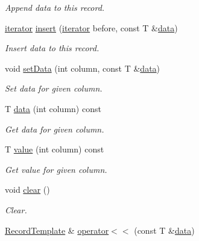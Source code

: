\begin{DoxyCompactItemize}
\begin{DoxyCompactList}\small\item\em Append data to this record. \end{DoxyCompactList}\item 
\hyperlink{class_mdt_1_1_plain_text_1_1_record_template_a0785bfc19bfa479d1097dbfcfdd03bef}{iterator} \hyperlink{class_mdt_1_1_plain_text_1_1_record_template_a473f1d26d8e87ccb714f802779e0b1e2}{insert} (\hyperlink{class_mdt_1_1_plain_text_1_1_record_template_a0785bfc19bfa479d1097dbfcfdd03bef}{iterator} before, const T \&\hyperlink{class_mdt_1_1_plain_text_1_1_record_template_aa6687a1e8e82a96fe3ae4d9fd79e8362}{data})
\begin{DoxyCompactList}\small\item\em Insert data to this record. \end{DoxyCompactList}\item 
void \hyperlink{class_mdt_1_1_plain_text_1_1_record_template_ade0db0c77de8a059b2eb1886e2357b39}{set\+Data} (int column, const T \&\hyperlink{class_mdt_1_1_plain_text_1_1_record_template_aa6687a1e8e82a96fe3ae4d9fd79e8362}{data})
\begin{DoxyCompactList}\small\item\em Set data for given column. \end{DoxyCompactList}\item 
T \hyperlink{class_mdt_1_1_plain_text_1_1_record_template_aa6687a1e8e82a96fe3ae4d9fd79e8362}{data} (int column) const 
\begin{DoxyCompactList}\small\item\em Get data for given column. \end{DoxyCompactList}\item 
T \hyperlink{class_mdt_1_1_plain_text_1_1_record_template_a40b9e693eaa8543769405400edf49ba3}{value} (int column) const 
\begin{DoxyCompactList}\small\item\em Get value for given column. \end{DoxyCompactList}\item 
void \hyperlink{class_mdt_1_1_plain_text_1_1_record_template_a27f9ec39a33476e291db3475bc4954c4}{clear} ()\hypertarget{class_mdt_1_1_plain_text_1_1_record_template_a27f9ec39a33476e291db3475bc4954c4}{}\label{class_mdt_1_1_plain_text_1_1_record_template_a27f9ec39a33476e291db3475bc4954c4}

\begin{DoxyCompactList}\small\item\em Clear. \end{DoxyCompactList}\item 
\hyperlink{class_mdt_1_1_plain_text_1_1_record_template}{Record\+Template} \& \hyperlink{class_mdt_1_1_plain_text_1_1_record_template_adcba095ec625e542401e309072985f5b}{operator$<$$<$} (const T \&\hyperlink{class_mdt_1_1_plain_text_1_1_record_template_aa6687a1e8e82a96fe3ae4d9fd79e8362}{data})\hypertarget{class_mdt_1_1_plain_text_1_1_record_template_adcba095ec625e542401e309072985f5b}{}\label{class_mdt_1_1_plain_text_1_1_record_template_adcba095ec625e542401e309072985f5b}


\end{DoxyCompactItemize}
